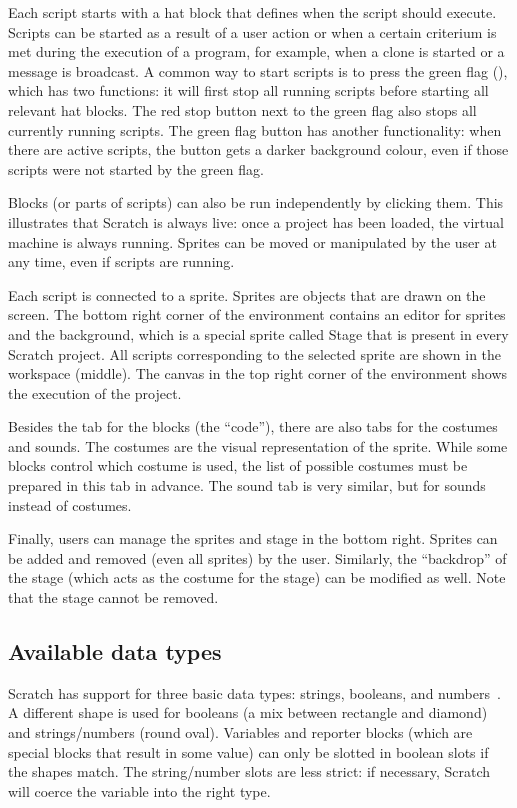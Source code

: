 \documentclass[../main]{subfiles}
\begin{document}
Each script starts with a hat block that defines when the script should execute.
Scripts can be started as a result of a user action or when a certain criterium is met during the execution of a program, for example, when a clone is started or a message is broadcast.
A common way to start scripts is to press the green flag (\greenflag), which has two functions: it will first stop all running scripts before starting all relevant hat blocks.
The red stop button next to the green flag also stops all currently running scripts.
The green flag button has another functionality: when there are active scripts, the button gets a darker background colour, even if those scripts were not started by the green flag.

Blocks (or parts of scripts) can also be run independently by clicking them.
This illustrates that Scratch is always live: once a project has been loaded, the virtual machine is always running.
Sprites can be moved or manipulated by the user at any time, even if scripts are running.

Each script is connected to a sprite.
Sprites are objects that are drawn on the screen.
The bottom right corner of the environment contains an editor for sprites and the background, which is a special sprite called Stage that is present in every Scratch project.
All scripts corresponding to the selected sprite are shown in the workspace (middle).
The canvas in the top right corner of the environment shows the execution of the project.

Besides the tab for the blocks (the ``code''), there are also tabs for the costumes and sounds.
The costumes are the visual representation of the sprite.
While some blocks control which costume is used, the list of possible costumes must be prepared in this tab in advance.
The sound tab is very similar, but for sounds instead of costumes.

Finally, users can manage the sprites and stage in the bottom right.
Sprites can be added and removed (even all sprites) by the user.
Similarly, the ``backdrop'' of the stage (which acts as the costume for the stage) can be modified as well.
Note that the stage cannot be removed.

\subsection{Available data types}\label{subsec:scratch-data-types}

Scratch has support for three basic data types: strings, booleans, and numbers~\autocite{maloneyScratchProgrammingLanguage2010a}.
A different shape is used for booleans (a mix between rectangle and diamond) and strings/numbers (round oval).
Variables and reporter blocks (which are special blocks that result in some value) can only be slotted in boolean slots if the shapes match.
The string/number slots are less strict: if necessary, Scratch will coerce the variable into the right type.
\end{document}

